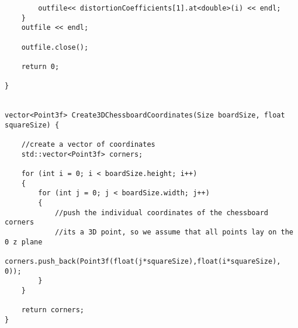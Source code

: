 \begin{verbatim}
		outfile<< distortionCoefficients[1].at<double>(i) << endl;
	}
	outfile << endl;

	outfile.close();

	return 0;

}


vector<Point3f> Create3DChessboardCoordinates(Size boardSize, float squareSize) {

	//create a vector of coordinates
	std::vector<Point3f> corners;

	for (int i = 0; i < boardSize.height; i++)
	{
		for (int j = 0; j < boardSize.width; j++)
		{
			//push the individual coordinates of the chessboard corners
			//its a 3D point, so we assume that all points lay on the 0 z plane
			corners.push_back(Point3f(float(j*squareSize),float(i*squareSize), 0));
		}
	}

	return corners;
}
\end{verbatim}

